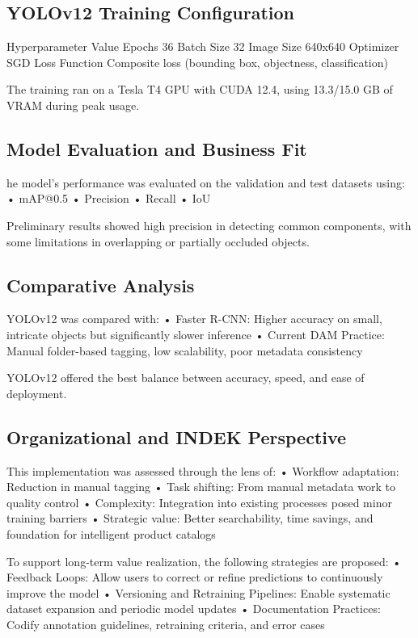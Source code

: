 \documentclass[a4paper,10pt,twocolumn]{article}
\numberwithin{figure}{section}
\numberwithin{table}{section}
\begin{document}
\subsection{YOLOv12 Training Configuration}

Hyperparameter
Value
Epochs
36
Batch Size
32
Image Size
640x640
Optimizer
SGD
Loss Function
Composite loss (bounding box, objectness, classification)

The training ran on a Tesla T4 GPU with CUDA 12.4, using 13.3/15.0 GB of VRAM during peak usage.

\subsection{Model Evaluation and Business Fit}

he model’s performance was evaluated on the validation and test datasets using:
	•	mAP@0.5
	•	Precision
	•	Recall
	•	IoU

Preliminary results showed high precision in detecting common components, with some limitations in overlapping or partially occluded objects.

\subsection{Comparative Analysis}
YOLOv12 was compared with:
	•	Faster R-CNN: Higher accuracy on small, intricate objects but significantly slower inference
	•	Current DAM Practice: Manual folder-based tagging, low scalability, poor metadata consistency

YOLOv12 offered the best balance between accuracy, speed, and ease of deployment.


\subsection{Organizational and INDEK Perspective}
This implementation was assessed through the lens of:
	•	Workflow adaptation: Reduction in manual tagging
	•	Task shifting: From manual metadata work to quality control
	•	Complexity: Integration into existing processes posed minor training barriers
	•	Strategic value: Better searchability, time savings, and foundation for intelligent product catalogs

    To support long-term value realization, the following strategies are proposed:
	•	Feedback Loops: Allow users to correct or refine predictions to continuously improve the model
	•	Versioning and Retraining Pipelines: Enable systematic dataset expansion and periodic model updates
	•	Documentation Practices: Codify annotation guidelines, retraining criteria, and error cases
\end{document}
